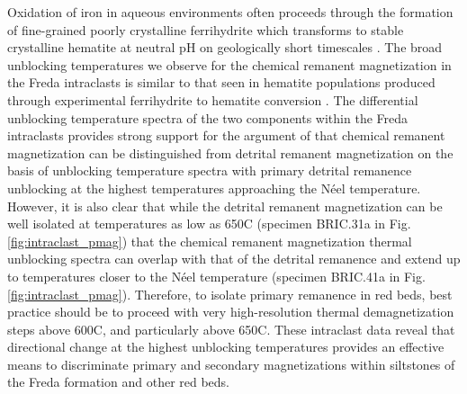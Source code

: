 \documentclass[11pt,letterpaper]{article}
\begin{document}
Oxidation of iron in aqueous environments often proceeds through the formation of fine-grained poorly crystalline ferrihydrite which transforms to stable crystalline hematite at neutral pH on geologically short timescales \citep{Cudennec2006a}. The broad unblocking temperatures we observe for the chemical remanent magnetization in the Freda intraclasts is similar to that seen in hematite populations produced through experimental ferrihydrite to hematite conversion \citep{Jiang2015a}. The differential unblocking temperature spectra of the two components within the Freda intraclasts provides strong support for the argument of \cite{Jiang2015a} that chemical remanent magnetization can be distinguished from detrital remanent magnetization on the basis of unblocking temperature spectra with primary detrital remanence unblocking at the highest temperatures approaching the N\'eel temperature. However, it is also clear that while the detrital remanent magnetization can be well isolated at temperatures as low as 650\textdegree C (specimen BRIC.31a in Fig. \ref{fig:intraclast_pmag}) that the chemical remanent magnetization thermal unblocking spectra can overlap with that of the detrital remanence and extend up to temperatures closer to the N\'eel temperature (specimen BRIC.41a in Fig. \ref{fig:intraclast_pmag}). Therefore, to isolate primary remanence in red beds, best practice should be to proceed with very high-resolution thermal demagnetization steps above 600\textdegree C, and particularly above 650\textdegree C. These intraclast data reveal that directional change at the highest unblocking temperatures provides an effective means to discriminate primary and secondary magnetizations within siltstones of the Freda formation and other red beds. 


 
%
\end{document}
